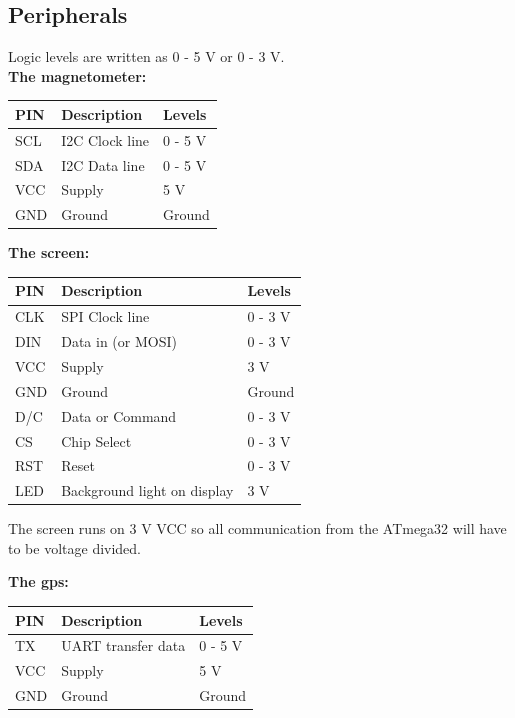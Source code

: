 \subsection{Peripherals}
Logic levels are written as 0 - 5 V or 0 - 3 V.\\

\textbf{The magnetometer:}\\
\begin{table}[H]
\centering
    \begin{tabular}{|l|l|l|}
    \hline
    PIN & Description    & Levels  \\ \hline
    SCL & I2C Clock line & 0 - 5 V \\ \hline
    SDA & I2C Data line  & 0 - 5 V \\ \hline
    VCC & Supply         & 5 V     \\ \hline
    GND & Ground         & Ground  \\ \hline
    \end{tabular}
\end{table}

\textbf{The screen:}\\
\begin{table}[H]
\centering
    \begin{tabular}{|l|l|l|}
    \hline
    PIN & Description    & Levels  \\ \hline
    CLK & SPI Clock line & 0 - 3 V \\ \hline
    DIN & Data in (or MOSI)  & 0 - 3 V \\ \hline
    VCC & Supply         & 3 V     \\ \hline
    GND & Ground         & Ground  \\ \hline
    D/C & Data or Command & 0 - 3 V \\ \hline
    CS  & Chip Select    & 0 - 3 V \\ \hline
    RST & Reset			 & 0 - 3 V \\ \hline
    LED & Background light on display & 3 V \\ \hline
    \end{tabular}
\end{table}
The screen runs on 3 V VCC so all communication from the ATmega32 will have to be voltage divided. 

\textbf{The gps:}\\
\begin{table}[H]
\centering
    \begin{tabular}{|l|l|l|}
    \hline
    PIN & Description    & Levels  \\ \hline
    TX & UART transfer data  & 0 - 5 V \\ \hline
    VCC & Supply         & 5 V     \\ \hline
    GND & Ground         & Ground  \\ \hline
    \end{tabular}
\end{table}